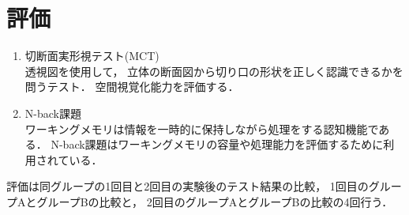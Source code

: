 \section{評価}
  \begin{enumerate}
    \item 切断面実形視テスト(MCT)\cite{MCT} \mbox{}\\
      透視図を使用して，
      立体の断面図から切り口の形状を正しく認識できるかを問うテスト．
      空間視覚化能力を評価する．
    \item N-back課題 \mbox{}\\
      ワーキングメモリは情報を一時的に保持しながら処理をする認知機能である．
      N-back課題はワーキングメモリの容量や処理能力を評価するために利用されている\cite{N-back}．
  \end{enumerate}

  評価は同グループの1回目と2回目の実験後のテスト結果の比較，
  1回目のグループAとグループBの比較と，
  2回目のグループAとグループBの比較の4回行う．
